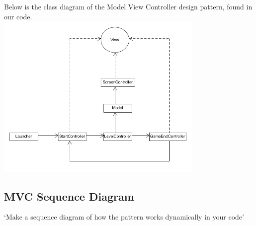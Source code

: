 Below is the class diagram of the Model View Controller design pattern, found in our code.
\\
\includegraphics[width=100mm]{UML_MVC.png}

\subsection{MVC Sequence Diagram}
`Make a sequence diagram of how the pattern works dynamically in your code'